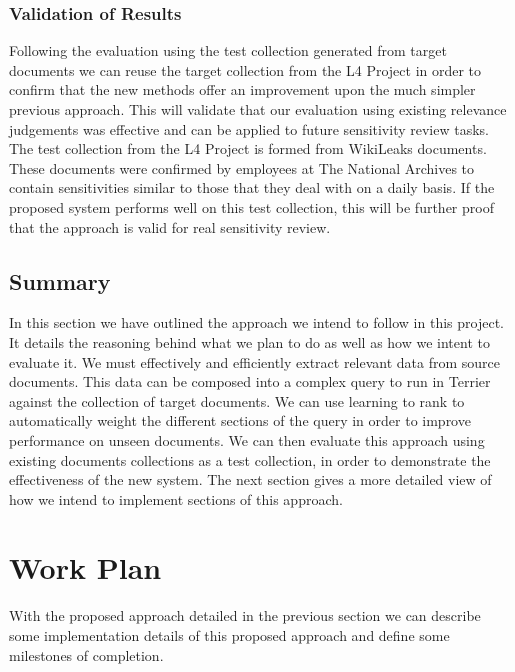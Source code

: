\documentclass{mprop}
\begin{document}
\subsubsection{Validation of Results}
Following the evaluation using the test collection generated from target documents we can reuse the target collection from the L4 Project in order to confirm that the new methods offer an improvement upon the much simpler previous approach.
This will validate that our evaluation using existing relevance judgements was effective and can be applied to future sensitivity review tasks.
The test collection from the L4 Project is formed from WikiLeaks documents.
These documents were confirmed by employees at The National Archives to contain sensitivities similar to those that they deal with on a daily basis.
If the proposed system performs well on this test collection, this will be further proof that the approach is valid for real sensitivity review.

\subsection{Summary}
In this section we have outlined the approach we intend to follow in this project. It details the reasoning behind what we plan to do as well as how we intent to evaluate it.
We must effectively and efficiently extract relevant data from source documents. 
This data can be composed into a complex query to run in Terrier against the collection of target documents. 
We can use learning to rank to automatically weight the different sections of the query in order to improve performance on unseen documents.
We can then evaluate this approach using existing documents collections as a test collection, in order to demonstrate the effectiveness of the new system.
The next section gives a more detailed view of how we intend to implement sections of this approach. 

\section{Work Plan} \label{work_plan}
With the proposed approach detailed in the previous section we can describe some implementation details of this proposed approach and define some milestones of completion.

\end{document}
